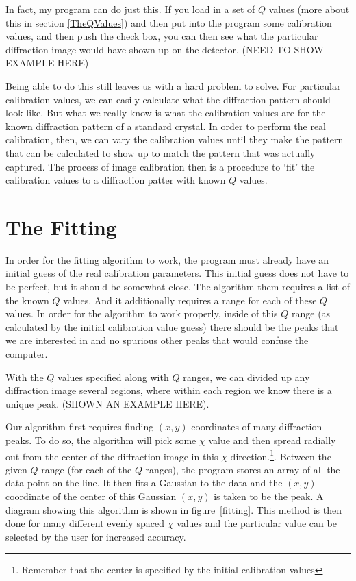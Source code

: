 In fact, my program can do just this. If you load in 
a set of $Q$ values (more about this in section 
\ref{TheQValues})
and then put into the program some calibration values,
and then push the  check box, 
you can then see what the particular diffraction
image would have shown up on the detector. 
(NEED TO SHOW EXAMPLE HERE)

Being able to do this still leaves us with a hard 
problem to solve. For particular calibration values,
we can easily calculate what the diffraction pattern 
should look like. But what we really know is what
the calibration values are for the known diffraction
pattern of a standard crystal. In order to perform the
real calibration, then, we can vary the calibration 
values until they make the pattern that can be calculated
to show up to match the pattern that was actually 
captured. The process of image calibration then is a 
procedure to `fit' the calibration values to a
diffraction patter with known $Q$ values.

\section{The Fitting} 
In order for the fitting algorithm to work, the program 
must already have an initial guess of the real calibration 
parameters. This initial guess does not have to be perfect, 
but it should be somewhat close. The algorithm them requires 
a list of the known $Q$ values. And it additionally requires 
a range for each of these $Q$ values. In order for the 
algorithm to work properly, inside of this $Q$ range (as 
calculated by the initial calibration value guess) there 
should be the peaks that we are interested in and no spurious 
other peaks that would confuse the computer.

With the $Q$ values specified along with $Q$ ranges, we can
divided up any diffraction image several regions, where
within each region we know there is a unique peak.
(SHOWN AN EXAMPLE HERE).

\begin{SCfigure}
\centering

\caption{Here is a diagram of the peak finding 
algorithm. ADD MORE OF A CAPTION}
\label{fitting}
\end{SCfigure}

Our algorithm first requires
finding $(x,y)$ coordinates 
of many diffraction peaks. To do so, the algorithm will 
pick some $\chi$ value and then 
spread radially out from the center of the diffraction
image in this $\chi$ direction.\footnote{Remember
that the center is specified by the initial calibration 
values}. Between the given $Q$ range (for each of the $Q$ 
ranges), the program stores an array of all the data point 
on the line. It then fits a Gaussian to the data and the
$(x,y)$ coordinate of the center of this Gaussian $(x,y)$ 
is taken to be the peak. A diagram showing this algorithm
is shown in figure~\ref{fitting}. This method is
then done for many different evenly spaced $\chi$ values
and the particular value can be selected by the user
for increased accuracy.

